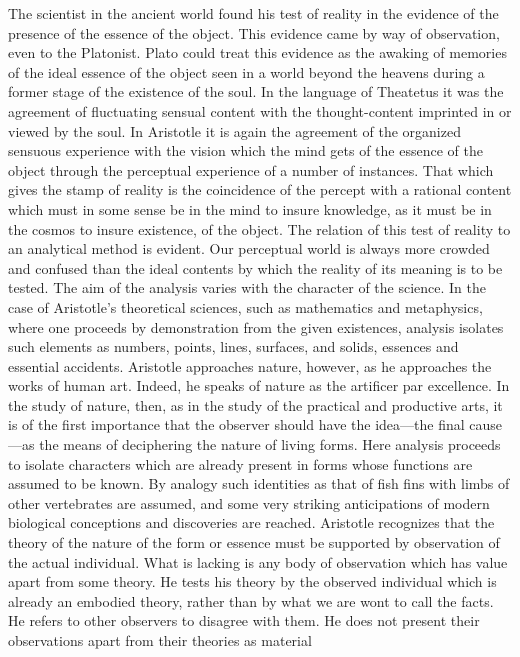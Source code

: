 \documentclass[12pt]{article}
\begin{document}
The scientist in the ancient world found his test of
reality in the evidence of the presence of the essence
of the object. This evidence came by way of observation,
even to the Platonist. Plato could treat this
evidence as the awaking of memories of the ideal essence
of the object seen in a world beyond the heavens during
a former stage of the existence of the soul. In the
language of Theatetus it was the agreement of fluctuating
sensual content with the thought-content imprinted
in or viewed by the soul. In Aristotle it is again
the agreement of the organized sensuous experience
with the vision which the mind gets of the essence of
the object through the perceptual experience of a number
of instances. That which gives the stamp of reality
is the coincidence of the percept with a rational content
which must in some sense be in the mind to insure
knowledge, as it must be in the cosmos to insure existence,
of the object. The relation of this test of reality
to an analytical method is evident. Our perceptual
world is always more crowded and confused than the
ideal contents by which the reality of its meaning is
to be tested. The aim of the analysis varies with the
character of the science. In the case of Aristotle's
theoretical sciences, such as mathematics and metaphysics,
where one proceeds by demonstration from the
given existences, analysis isolates such elements as
numbers, points, lines, surfaces, and solids, essences
and essential accidents. Aristotle approaches nature,
however, as he approaches the works of human art.
Indeed, he speaks of nature as the artificer par excellence.
In the study of nature, then, as in the study
of the practical and productive arts, it is of the first
importance that the observer should have the idea—the
final cause—as the means of deciphering the nature of
living forms. Here analysis proceeds to isolate characters
which are already present in forms whose functions
are assumed to be known. By analogy such identities
as that of fish fins with limbs of other vertebrates are
assumed, and some very striking anticipations of modern
biological conceptions and discoveries are reached.
Aristotle recognizes that the theory of the nature of
the form or essence must be supported by observation
of the actual individual. What is lacking is any body
of observation which has value apart from some theory.
He tests his theory by the observed individual which
is already an embodied theory, rather than by what
we are wont to call the facts. He refers to other observers
to disagree with them. He does not present
their observations apart from their theories as material
\end{document}
